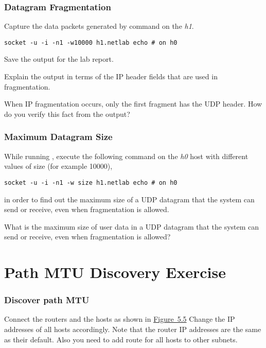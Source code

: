 \documentclass{../UTNetLab}
\begin{document}
\section{Datagram Fragmentation}
Capture the data packets generated by  command on the \textit{h1}.

\begin{lstlisting}[emph={h1,netlab},morekeywords={[3]echo}]
socket -u -i -n1 -w10000 h1.netlab echo # on h0
    \end{lstlisting}
Save the  output for the lab report.

\begin{report}
    \item Explain the  output in terms of the IP header fields that are used in fragmentation.

    \item When IP fragmentation occurs, only the first fragment has the UDP header.
    How do you verify this fact from the  output?
\end{report}


\section{Maximum Datagram Size}
\label{sec:MaxDatagramSize}
While running , execute the following command on the \textit{h0} host with different values of size (for example 10000),
\begin{lstlisting}[emph={size, h1,netlab},morekeywords={[3]echo}]
socket -u -i -n1 -w size h1.netlab echo # on h0
\end{lstlisting}
in order to find out the maximum size of a UDP datagram that the system can send or receive, even when fragmentation is allowed.

\begin{report}
    \item What is the maximum size of user data in a UDP datagram that the system can send or receive, even when fragmentation is allowed?
\end{report}


\part{Path MTU Discovery Exercise}\label{sec:PMTUD}

\section{Discover path MTU}
Connect the routers and the hosts as shown in \hyperref[fig:5.5]{Figure~5.5} Change the IP addresses of all hosts accordingly.
Note that the router IP addresses are the same as their default.
Also you need to add route for all hosts to other subnets.
\end{document}
